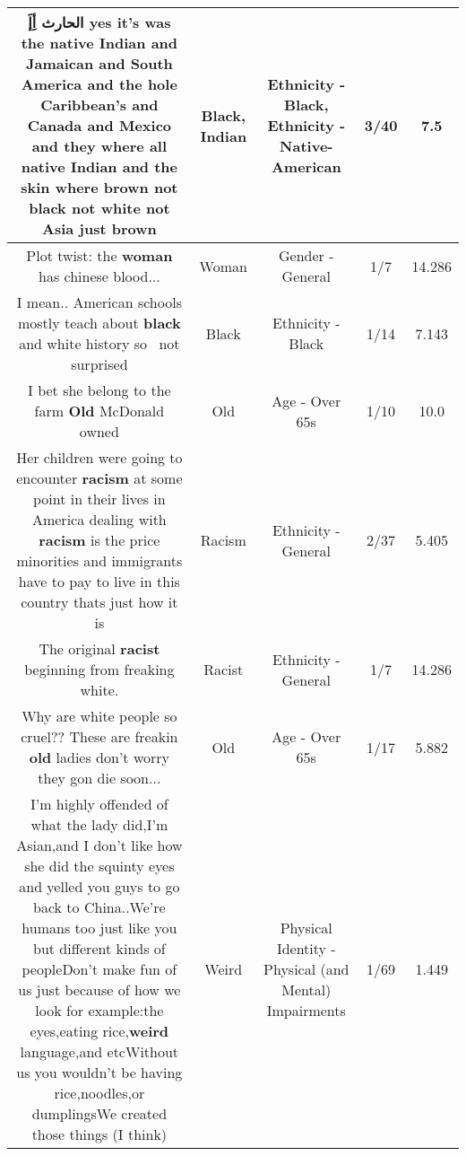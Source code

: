 \documentclass[11pt]{article}
\newlength\mylength
\begin{document}
\begin{center}
\begin{longtable}{|C{.65\mylength}|C{.30\mylength}|C{.12\mylength}|C{.12\mylength}|C{.12\mylength}|}
  \small الحارث أِإَ yes it's was the native \textbf{Indian} and Jamaican and South America and the hole   Caribbean's and Canada and Mexico and they where all native \textbf{Indian} and the skin where brown not \textbf{black} not white not Asia just brown\normalsize   & Black, Indian & Ethnicity - Black, Ethnicity - Native-American & 3/40 & 7.5 \\  \hline
  \small Plot twist: the \textbf{woman} has chinese blood...\normalsize   & Woman & Gender - General & 1/7 & 14.286 \\  \hline
  \small I mean.. American schools mostly teach about \textbf{black} and white history so~ not surprised\normalsize   & Black & Ethnicity - Black & 1/14 & 7.143 \\  \hline
  \small I bet she belong to the farm \textbf{Old} McDonald owned\normalsize   & Old & Age - Over 65s & 1/10 & 10.0 \\  \hline
  \small Her children were going to encounter \textbf{racism} at some point in their lives in America dealing with \textbf{racism} is the price minorities and immigrants have to pay to live in this country thats just how it is\normalsize   & Racism & Ethnicity - General & 2/37 & 5.405 \\  \hline
  \small The original \textbf{racist} beginning from freaking white.\normalsize   & Racist & Ethnicity - General & 1/7 & 14.286 \\  \hline
  \small Why are white people so cruel?? These are freakin \textbf{old} ladies don't worry they gon die soon...\normalsize   & Old & Age - Over 65s & 1/17 & 5.882 \\  \hline
  \small I'm highly offended of what the lady did,I'm Asian,and I don't like how she did the squinty eyes and yelled you guys to go back to China..We're humans too just like you but different kinds of peopleDon't make fun of us just because of how we look for example:the eyes,eating rice,\textbf{weird} language,and etcWithout us you wouldn't be having rice,noodles,or dumplingsWe created those things (I think)\normalsize   & Weird & Physical Identity - Physical (and Mental) Impairments & 1/69 & 1.449 \\  \hline

\end{longtable}
\end{center}
\end{document}
